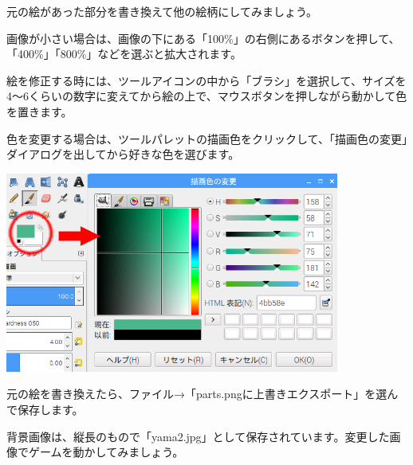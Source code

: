 \documentclass[a4paper,12pt]{jarticle}
\begin{document}
\bigskip
\bigskip
\bigskip

元の絵があった部分を書き換えて他の絵柄にしてみましょう。


\bigskip

画像が小さい場合は、画像の下にある「100\%」の右側にあるボタンを押して、「400\%」「800\%」などを選ぶと拡大されます。

絵を修正する時には、ツールアイコンの中から「ブラシ」を選択して、サイズを4〜6くらいの数字に変えてから絵の上で、マウスボタンを押しながら動かして色を置きます。


\bigskip

色を変更する場合は、ツールパレットの描画色をクリックして、「描画色の変更」ダイアログを出してから好きな色を選びます。

\bigskip
\bigskip

\begin{minipage}{9.781cm}
\centering
{\upshape
\includegraphics[keepaspectratio,width=10.993cm,height=6.588cm]{text04-img/text04-img031.png}}
\end{minipage}

\bigskip
\bigskip
\bigskip

元の絵を書き換えたら、ファイル→「parts.pngに上書きエクスポート」を選んで保存します。

\bigskip

背景画像は、縦長のもので「yama2.jpg」として保存されています。変更した画像でゲームを動かしてみましょう。

\bigskip
\bigskip
\end{document}
